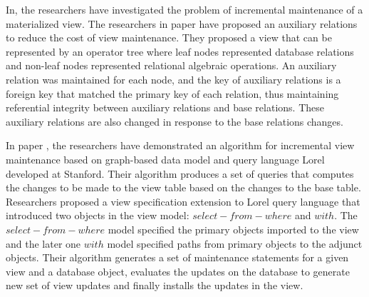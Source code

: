 \documentclass[11pt,a4paper,bibtotoc,idxtotoc,headsepline,footsepline,footexclude,BCOR12mm,DIV13]{scrbook}
\begin{document}
In\cite{incremental:materializedviews}, the researchers have investigated the problem of incremental maintenance of a materialized view. The researchers in paper\cite{incremental:materializedviews} have proposed an auxiliary relations to reduce the cost of view maintenance. They proposed a view that can be represented by an operator tree\cite{database:concepts} where leaf nodes represented database relations and non-leaf nodes represented relational algebraic operations. An auxiliary relation was maintained for each node, and the key of auxiliary relations is a foreign key that matched the primary key of each relation, thus maintaining referential integrity between auxiliary relations and base relations\cite{database:concepts}. These auxiliary relations are also changed in response to the base relations changes.

In paper \cite{incrementalmaintenance:materializedviews}, the researchers have demonstrated an algorithm for incremental view maintenance based on graph-based data model and query language Lorel developed at Stanford. Their algorithm produces a set of queries that computes the changes to be made to the view table based on the changes to the base table. Researchers proposed a view specification extension to Lorel query language\cite{incrementalmaintenance:materializedviews} that introduced two objects in the view model: $select-from-where$ and $with$. The $select-from-where$ model specified the primary objects imported to the view and the later one $with$ model specified paths from primary objects to the adjunct objects\cite{incrementalmaintenance:materializedviews}. Their algorithm generates a set of maintenance statements for a given view and a database object, evaluates the updates on the database to generate new set of view updates and finally installs the updates in the view\cite{incrementalmaintenance:materializedviews}.
\end{document}
